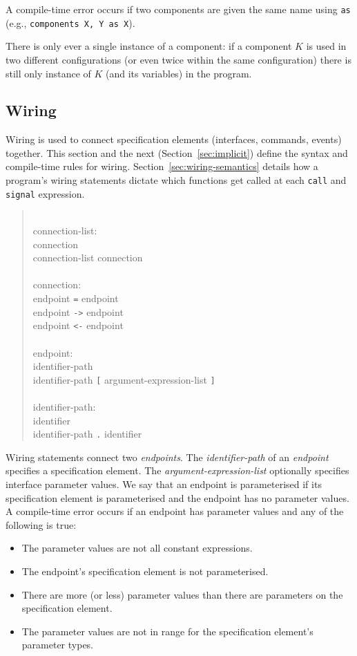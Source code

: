 \documentclass[11pt,letterpaper]{article}
\newcommand{\kw}[1]{{\tt #1}}
\newcommand{\code}[1]{{\tt #1}}
\newcommand{\grammarshift}{\vspace*{-.7cm}}
\newcommand{\grammarindent}{\hspace*{2cm}\= \\ \kill}
\begin{document}
A compile-time error occurs if two components are given the same name using \kw{as} (e.g., \code{components X, Y as X}).

There is only ever a single instance of a component: if a component $K$
is used in two different configurations (or even twice within the same
configuration) there is still only instance of $K$ (and its variables)
in the program.

\subsection{Wiring}
\label{sec:wiring}

Wiring is used to connect specification elements (interfaces, commands,
events) together. This section and the next (Section~\ref{sec:implicit})
define the syntax and compile-time rules for
wiring. Section~\ref{sec:wiring-semantics} details how a program's wiring
statements dictate which functions get called at each \kw{call} and
\kw{signal} expression.  \begin{quote} \grammarshift \em \begin{tabbing}
\grammarindent
connection-list:\\
\>	connection\\
\>	connection-list connection\\
\\
connection:\\
\>	endpoint \kw{=} endpoint\\
\>	endpoint \kw{->} endpoint\\
\>	endpoint \kw{<-} endpoint\\
\\
endpoint:\\
\>	identifier-path \\
\>	identifier-path \kw{[} argument-expression-list \kw{]}\\
\\
identifier-path:\\
\>	identifier\\
\>	identifier-path \kw{.} identifier\\
\end{tabbing} \end{quote}


Wiring statements connect two \emph{endpoints}. The \emph{identifier-path}
of an \emph{endpoint} specifies a specification element. The
\emph{argument-expression-list} optionally specifies interface parameter
values. We say that an endpoint is parameterised if its specification
element is parameterised and the endpoint has no parameter values. A
compile-time error occurs if an endpoint has parameter values and any of
the following is true:
\begin{itemize}
\item The parameter values are not all constant expressions.
\item The endpoint's specification element is not parameterised.
\item There are more (or less) parameter values than there are parameters
on the specification element.
\item The parameter values are not in range for the specification element's
parameter types.
\end{itemize}
\end{document}
